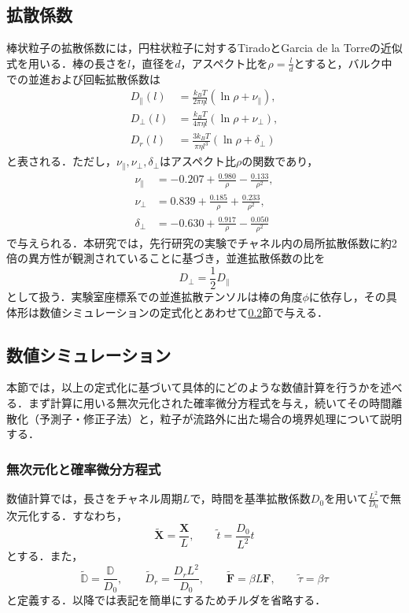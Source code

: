 \documentclass[dvipdfmx]{ampbt}
\begin{document}
  \subsection{拡散係数}
  棒状粒子の拡散係数には，円柱状粒子に対するTiradoとGarcia de la Torreの近似式\cite{tirado1979,tirado1980}を用いる．棒の長さを$l$，直径を$d$，アスペクト比を$\rho=\frac{l}{d}$とすると，バルク中での並進および回転拡散係数は
  \begin{align}
    D_{\parallel}(l)
     & =
    \frac{k_BT}{2\pi\eta l}
    \left(\ln \rho+\nu_{\parallel}\right), \\
    D_{\perp}(l)
     & =
    \frac{k_BT}{4\pi\eta l}
    \left(\ln \rho+\nu_{\perp}\right),     \\
    D_r(l)
     & =
    \frac{3k_BT}{\pi\eta l^3}
    \left(\ln \rho+\delta_{\perp}\right)
  \end{align}
  と表される．ただし，$\nu_{\parallel},\nu_{\perp},\delta_{\perp}$はアスペクト比$\rho$の関数であり，
  \begin{align}
    \nu_{\parallel}
     & =-0.207+\frac{0.980}{\rho}-\frac{0.133}{\rho^2}, \\
    \nu_{\perp}
     & =0.839+\frac{0.185}{\rho}+\frac{0.233}{\rho^2},  \\
    \delta_{\perp}
     & =-0.630+\frac{0.917}{\rho}-\frac{0.050}{\rho^2}
  \end{align}
  で与えられる．本研究では，先行研究の実験でチャネル内の局所拡散係数に約2倍の異方性が観測されていること\cite{yang2019}に基づき，並進拡散係数の比を
  \begin{equation}
    D_{\perp}= \frac{1}{2} D_{\parallel}
    \label{eq:diffusion-ratio}
  \end{equation}
  として扱う．実験室座標系での並進拡散テンソルは棒の角度$\phi$に依存し，その具体形は数値シミュレーションの定式化とあわせて\ref{subsec:simulation}節で与える．

  \subsection{数値シミュレーション}
  \label{subsec:simulation}
  本節では，以上の定式化に基づいて具体的にどのような数値計算を行うかを述べる．まず計算に用いる無次元化された確率微分方程式を与え，続いてその時間離散化（予測子・修正子法）と，粒子が流路外に出た場合の境界処理について説明する．

  \subsubsection{無次元化と確率微分方程式}
  数値計算では，長さをチャネル周期$L$で，時間を基準拡散係数$D_0$を用いて$\frac{L^2}{D_0}$で無次元化する．すなわち，
  \begin{equation}
    \widetilde{\bm{X}}=\frac{\bm{X}}{L},\qquad
    \widetilde{t}=\frac{D_0}{L^2}t
  \end{equation}
  とする．また，
  \begin{equation}
    \widetilde{\mathbb{D}}=\frac{\mathbb{D}}{D_0},\qquad
    \widetilde{D}_r=\frac{D_rL^2}{D_0},\qquad
    \widetilde{\bm{F}}=\beta L\bm{F},\qquad
    \widetilde{\tau}=\beta\tau
  \end{equation}
  と定義する．以降では表記を簡単にするためチルダを省略する．
\end{document}
